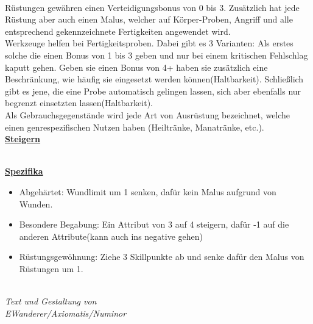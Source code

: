 \documentclass[twoside,a4paper]{minimal}
\begin{document}
\begin{multicols*}{3}
\\Rüstungen gewähren einen Verteidigungsbonus von 0 bis 3. Zusätzlich hat jede Rüstung aber auch einen Malus, welcher auf Körper-Proben, Angriff und alle entsprechend gekennzeichnete Fertigkeiten angewendet wird.
\\Werkzeuge helfen bei Fertigkeitsproben. Dabei gibt es 3 Varianten: Als erstes solche die einen Bonus von 1 bis 3 geben und nur bei einem kritischen Fehlschlag kaputt gehen. Geben sie einen Bonus von 4+ haben sie zusätzlich eine Beschränkung, wie häufig sie eingesetzt werden können(Haltbarkeit). Schließlich gibt es jene, die eine Probe automatisch gelingen lassen, sich aber ebenfalls nur begrenzt einsetzten lassen(Haltbarkeit).
\\Als Gebrauchsgegenstände wird jede Art von Ausrüstung bezeichnet, welche einen genrespezifischen Nutzen haben (Heiltränke, Manatränke, etc.).
\textbf{\uline{\\Steigern}}

\textbf{\uline{\\Spezifika}}
\begin{itemize}
\item Abgehärtet: Wundlimit um 1 senken, dafür kein Malus aufgrund von Wunden.
\item Besondere Begabung: Ein Attribut von 3 auf 4 steigern, dafür -1 auf die anderen Attribute(kann auch ins negative gehen)
\item Rüstungsgewöhnung: Ziehe 3 Skillpunkte ab und senke dafür den Malus von Rüstungen um 1.
\end{itemize}
\textit{\\Text und Gestaltung von\\EWanderer/Axiomatis/Numinor}
\end{multicols*}
\end{document}
